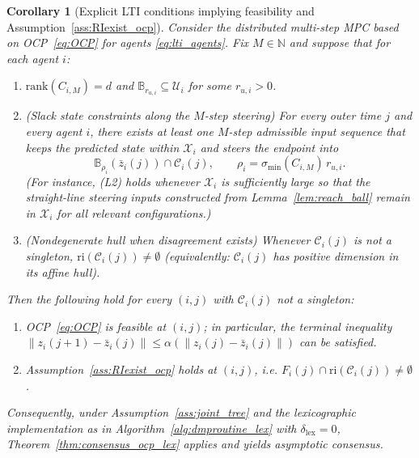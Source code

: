 \documentclass[12pt,draftcls,onecolumn]{IEEEtran}
\newtheorem{corollary}{Corollary}
\def\field#1{\mathbb #1}%
\def\N{\field{N}}%
\def\B{\field{B}}%
\newcommand{\X}{\ensuremath{\mathcal X}}
\newcommand{\U}{\ensuremath{\mathcal U}}
\def\Ci{\mathcal{C}_i}
\def\ri{\mathrm{ri}}
\def\rank{\mathrm{rank}}
\begin{document}
\begin{corollary}[Explicit LTI conditions implying feasibility and Assumption~\ref{ass:RIexist_ocp}]\label{cor:lti_feas_ri}
Consider the distributed multi-step MPC based on OCP~\eqref{eq:OCP} for agents \eqref{eq:lti_agents}.
Fix $M\in\N$ and suppose that for each agent $i$:
\begin{enumerate}
\item[(L1)] $\rank(C_{i,M})=d$ and $\B_{r_{u,i}}\subseteq \U_i$ for some $r_{u,i}>0$.
\item[(L2)] (Slack state constraints along the $M$-step steering) For every outer time $j$ and every
agent $i$, there exists at least one $M$-step admissible input sequence that keeps the predicted
state within $\X_i$ and steers the endpoint into
\[
\B_{\rho_i}(\bar z_i(j))\cap \Ci(j),
\qquad \rho_i=\sigma_{\min}(C_{i,M})\,r_{u,i}.
\]
(For instance, (L2) holds whenever $\X_i$ is sufficiently large so that the straight-line steering
inputs constructed from Lemma~\ref{lem:reach_ball} remain in $\X_i$ for all relevant configurations.)
\item[(L3)] (Nondegenerate hull when disagreement exists) Whenever $\Ci(j)$ is not a singleton,
$\ri(\Ci(j))\neq\emptyset$ (equivalently: $\Ci(j)$ has positive dimension in its affine hull).
\end{enumerate}
Then the following hold for every $(i,j)$ with $\Ci(j)$ not a singleton:
\begin{enumerate}
\item[(a)] OCP~\eqref{eq:OCP} is feasible at $(i,j)$; in particular, the terminal inequality
$\|z_i(j{+}1)-\bar z_i(j)\|\le \alpha(\|z_i(j)-\bar z_i(j)\|)$ can be satisfied.
\item[(b)] Assumption~\ref{ass:RIexist_ocp} holds at $(i,j)$, i.e. $F_i(j)\cap \ri(\Ci(j))\neq\emptyset$.
\end{enumerate}
Consequently, under Assumption~\ref{ass:joint_tree} and the lexicographic implementation as in Algorithm~\ref{alg:dmproutine_lex} with $\delta_{\mathrm{lex}} = 0$,
Theorem~\ref{thm:consensus_ocp_lex} applies and yields asymptotic consensus.
\end{corollary}
\end{document}
